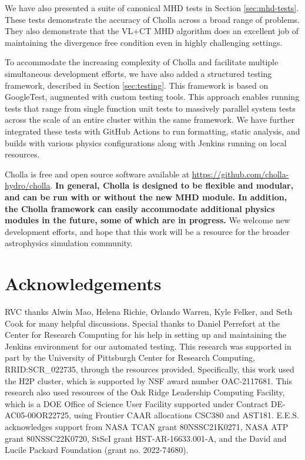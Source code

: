 \documentclass[modern, linenumbers]{aastex631}
\begin{document}
We have also presented a suite of canonical MHD tests in Section \ref{sec:mhd-tests}. These tests demonstrate the accuracy of Cholla across a broad range of problems. They also demonstrate that the VL+CT MHD algorithm does an excellent job of maintaining the divergence free condition even in highly challenging settings.

To accommodate the increasing complexity of Cholla and facilitate multiple simultaneous development efforts, we have also added a structured testing framework, described in Section \ref{sec:testing}. This framework is based on GoogleTest, augmented with custom testing tools. This approach enables running tests that range from single function unit tests to massively parallel system tests across the scale of an entire cluster within the same framework. We have further integrated these tests with GitHub Actions to run formatting, static analysis, and builds with various physics configurations along with Jenkins running on local resources.

Cholla is free and open source software available at \url{https://github.com/cholla-hydro/cholla}. \textbf{In general, Cholla is designed to be flexible and modular, and can be run with or without the new MHD module. In addition, the Cholla framework can easily accommodate additional physics modules in the future, some of which are in progress.} We welcome new development efforts, and hope that this work will be a resource for the broader astrophysics simulation community.


\section{Acknowledgements}

RVC thanks Alwin Mao, Helena Richie, Orlando Warren, Kyle Felker, and Seth Cook for many helpful discussions. Special thanks to Daniel Perrefort at the Center for Research Computing for his help in setting up and maintaining the Jenkins environment for our automated testing. This research was supported in part by the University of Pittsburgh Center for Research Computing, RRID:SCR\_022735, through the resources provided. Specifically, this work used the H2P cluster, which is supported by NSF award number OAC-2117681. This research also used resources of the Oak Ridge Leadership Computing Facility, which is a DOE Office of Science User Facility supported under Contract DE-AC05-00OR22725, using Frontier CAAR allocations CSC380 and AST181. E.E.S. acknowledges support from NASA TCAN grant 80NSSC21K0271, NASA ATP grant 80NSSC22K0720, StScI grant HST-AR-16633.001-A, and the David and Lucile Packard Foundation (grant no. 2022-74680).



\end{document}
